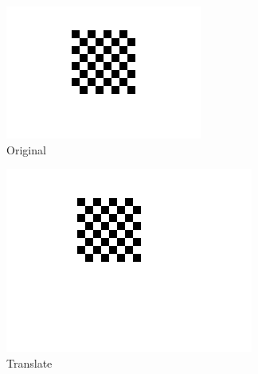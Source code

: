 \documentclass[a4paper,10pt]{article}
\begin{document}
       \begin{figure}[h]
         \centering
         \begin{subfigure}[b]{.16\textwidth}
           \includegraphics[width=\textwidth]{orig}
           \caption{Original}
           \label{fig:orig}
         \end{subfigure}
         \begin{subfigure}[b]{.16\textwidth}
           \includegraphics[width=\textwidth]{translate}
           \caption{Translate}
           \label{fig:trans}
          \end{subfigure}
          \begin{subfigure}[b]{.16\textwidth}

\end{subfigure}
\end{figure}
\end{document}
